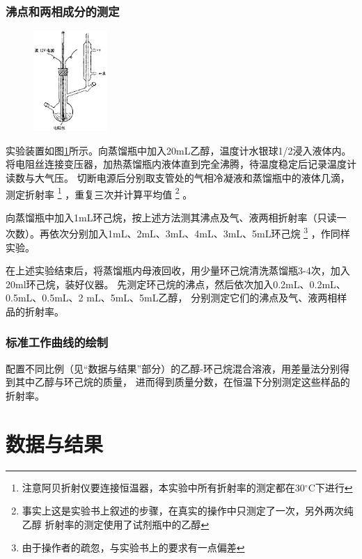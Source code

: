 \documentclass[12pt]{article}
\newcommand{\mr}[1]{\mathrm{#1}}
\def\celsius{^{\circ}\mr{C}}  %
\begin{document}
			\subsubsection{沸点和两相成分的测定}
			\begin{figure}[h]
				\centering
				\includegraphics[width=0.25\textwidth]{device.png}
				\label{exp device}
			\end{figure}
			\par 
			实验装置如图\ref{exp device}所示。向蒸馏瓶中加入20mL乙醇，温度计水银球1/2浸入液体内。
			将电阻丝连接变压器，加热蒸馏瓶内液体直到完全沸腾，待温度稳定后记录温度计读数与大气压。
			切断电源后分别取支管处的气相冷凝液和蒸馏瓶中的液体几滴，测定折射率
			\footnote{注意阿贝折射仪要连接恒温器，本实验中所有折射率的测定都在30$\celsius$下进行}
			，重复三次并计算平均值
			\footnote{事实上这是实验书上叙述的步骤，在真实的操作中只测定了一次，另外两次纯乙醇
			折射率的测定使用了试剂瓶中的乙醇}
			。
			\par
			向蒸馏瓶中加入1mL环己烷，按上述方法测其沸点及气、液两相折射率（只读一
			次数）。再依次分别加入1mL、2mL、3mL、4mL、3mL、5mL环己烷
			\footnote{由于操作者的疏忽，与实验书上的要求有一点偏差}
			，作同样实验。
			\par 
			在上述实验结束后，将蒸馏瓶内母液回收，用少量环己烷清洗蒸馏瓶3-4次，加入20ml环己烷，装好仪器。
			先测定环己烷的沸点，然后依次加入0.2mL、0.2mL、0.5mL、0.5mL、2 mL、5mL、5mL乙醇，
			分别测定它们的沸点及气、液两相样品的折射率。
			\subsubsection{标准工作曲线的绘制}
			配置不同比例（见“数据与结果”部分）的乙醇-环己烷混合溶液，用差量法分别得到其中乙醇与环己烷的质量，
			进而得到质量分数，在恒温下分别测定这些样品的折射率。
	\vbox{}  
	\section{数据与结果}
\end{document}
